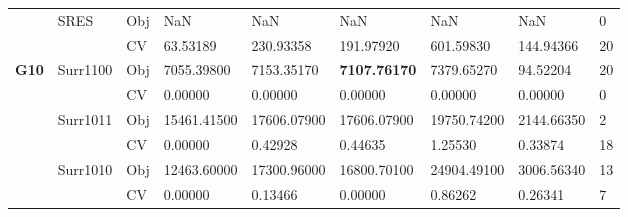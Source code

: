 \begin{table*}[!htb]
\begin{tabular}{lllllllll}
		& \multirow{2}{*}{SRES}              & Obj                                & NaN                                & NaN                                & NaN                                  & NaN                                 & NaN                               & 0                \\
		&                                    & CV                                 & 63.53189                           & 230.93358                          & 191.97920                            & 601.59830                           & 144.94366                         & 20               \\ \hline
		\multirow{16}{*}{\textbf{G10}}               & \multirow{2}{*}{Surr1100}          & Obj                                & 7055.39800                         & 7153.35170                         & \textbf{7107.76170}                  & 7379.65270                          & 94.52204                          & 20               \\
		&                                    & CV                                 & 0.00000                            & 0.00000                            & 0.00000                              & 0.00000                             & 0.00000                           & 0                \\
		& \multirow{2}{*}{Surr1011}          & Obj                                & 15461.41500                        & 17606.07900                        & 17606.07900                          & 19750.74200                         & 2144.66350                        & 2                \\
		&                                    & CV                                 & 0.00000                            & 0.42928                            & 0.44635                              & 1.25530                             & 0.33874                           & 18               \\
		& \multirow{2}{*}{Surr1010}          & Obj                                & 12463.60000                        & 17300.96000                        & 16800.70100                          & 24904.49100                         & 3006.56340                        & 13               \\
		&                                    & CV                                 & 0.00000                            & 0.13466                            & 0.00000                              & 0.86262                             & 0.26341                           & 7                \\

\end{tabular}
\end{table*}
